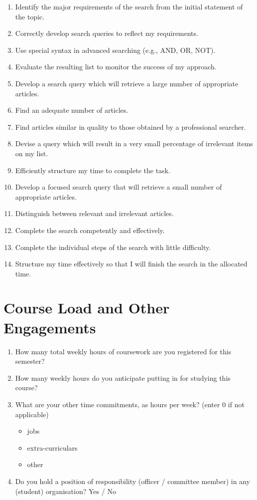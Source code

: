 \documentclass[letterpaper, nobind]{templates/ociamthesis}
\providecommand{\tightlist}{%
  \setlength{\itemsep}{0pt}\setlength{\parskip}{0pt}}
\begin{document}
\begin{enumerate}
\def\labelenumi{\arabic{enumi}.}
\setcounter{enumi}{18}
\tightlist
\item
  Identify the major requirements of the search from the initial statement of the topic.
\item
  Correctly develop search queries to reflect my requirements.
\item
  Use special syntax in advanced searching (e.g., AND, OR, NOT).
\item
  Evaluate the resulting list to monitor the success of my approach.
\item
  Develop a search query which will retrieve a large number of appropriate articles.
\item
  Find an adequate number of articles.
\item
  Find articles similar in quality to those obtained by a professional searcher.
\item
  Devise a query which will result in a very small percentage of irrelevant items on my list.
\item
  Efficiently structure my time to complete the task.
\item
  Develop a focused search query that will retrieve a small number of appropriate articles.
\item
  Distinguish between relevant and irrelevant articles.
\item
  Complete the search competently and effectively.
\item
  Complete the individual steps of the search with little difficulty.
\item
  Structure my time effectively so that I will finish the search in the allocated time.
\end{enumerate}

\hypertarget{app-course-load}{%
\section{Course Load and Other Engagements}\label{app-course-load}}

\begin{enumerate}
\def\labelenumi{\arabic{enumi}.}
\tightlist
\item
  How many total weekly hours of coursework are you registered for this semester?
\item
  How many weekly hours do you anticipate putting in for studying this course?
\item
  What are your other time commitments, as hours per week? (enter 0 if not applicable)

  \begin{itemize}
  \tightlist
  \item
    jobs
  \item
    extra-curriculars
  \item
    other
  \end{itemize}
\item
  Do you hold a position of responsibility (officer / committee member) in any (student) organisation? Yes / No
\end{enumerate}
\end{document}
